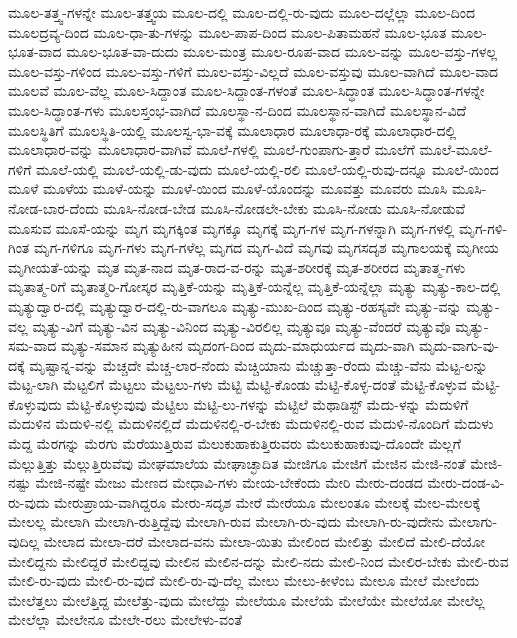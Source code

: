 {ಮೂಲ-ತತ್ತ್ವ-ಗಳನ್ನೇ
ಮೂಲ-ತತ್ತ್ವಯ
ಮೂಲ-ದಲ್ಲಿ
ಮೂಲ-ದಲ್ಲಿ-ರು-ವುದು
ಮೂಲ-ದಲ್ಲೆಲ್ಲಾ
ಮೂಲ-ದಿಂದ
ಮೂಲದ್ರವ್ಯ-ದಿಂದ
ಮೂಲ-ಧಾ-ತು-ಗಳನ್ನು
ಮೂಲ-ಪಾಪ-ದಿಂದ
ಮೂಲ-ಪಿತಾಮಹನೆ
ಮೂಲ-ಭೂತ
ಮೂಲ-ಭೂತ-ವಾದ
ಮೂಲ-ಭೂತ-ವಾ-ದುದು
ಮೂಲ-ಮಂತ್ರ
ಮೂಲ-ರೂಪ-ವಾದ
ಮೂಲ-ವನ್ನು
ಮೂಲ-ವಸ್ತು-ಗಳಲ್ಲ
ಮೂಲ-ವಸ್ತು-ಗಳಿಂದ
ಮೂಲ-ವಸ್ತು-ಗಳಿಗೆ
ಮೂಲ-ವಸ್ತು-ವಿಲ್ಲದೆ
ಮೂಲ-ವಸ್ತುವು
ಮೂಲ-ವಾಗಿದೆ
ಮೂಲ-ವಾದ
ಮೂಲವೆ
ಮೂಲ-ವೆಲ್ಲ
ಮೂಲ-ಸಿದ್ದಾಂತ
ಮೂಲ-ಸಿದ್ದಾಂತ-ಗಳಂತೆ
ಮೂಲ-ಸಿದ್ಧಾಂತ
ಮೂಲ-ಸಿದ್ಧಾಂತ-ಗಳನ್ನೇ
ಮೂಲ-ಸಿದ್ಧಾಂತ-ಗಳು
ಮೂಲಸ್ತಂಭ-ವಾಗಿದೆ
ಮೂಲಸ್ಥಾ-ನ-ದಿಂದ
ಮೂಲಸ್ಥಾನ-ವಾಗಿದೆ
ಮೂಲಸ್ಥಾನ-ವಿದೆ
ಮೂಲಸ್ಥಿತಿಗೆ
ಮೂಲಸ್ಥಿತಿ-ಯಲ್ಲಿ
ಮೂಲಸ್ವ-ಭಾ-ವಕ್ಕೆ
ಮೂಲಾಧಾರ
ಮೂಲಾಧಾ-ರಕ್ಕೆ
ಮೂಲಾಧಾರ-ದಲ್ಲಿ
ಮೂಲಾಧಾರ-ವನ್ನು
ಮೂಲಾಧಾರ-ವಾಗಿವೆ
ಮೂಲೆ-ಗಳಲ್ಲಿ
ಮೂಲೆ-ಗುಂಪಾಗು-ತ್ತಾರೆ
ಮೂಲೆಗೆ
ಮೂಲೆ-ಮೂಲೆ-ಗಳಿಗೆ
ಮೂಲೆ-ಯಲ್ಲಿ
ಮೂಲೆ-ಯಲ್ಲಿ-ಡು-ವುದು
ಮೂಲೆ-ಯಲ್ಲಿ-ರಲಿ
ಮೂಲೆ-ಯಲ್ಲಿ-ರುವು-ದನ್ನೂ
ಮೂಲೆ-ಯಿಂದ
ಮೂಳೆ
ಮೂಳೆಯ
ಮೂಳೆ-ಯನ್ನು
ಮೂಳೆ-ಯಿಂದ
ಮೂಳೆ-ಯೊಂದನ್ನು
ಮೂವತ್ತು
ಮೂವರು
ಮೂಸಿ
ಮೂಸಿ-ನೋಡ-ಬಾರ-ದೆಂದು
ಮೂಸಿ-ನೋಡ-ಬೇಡ
ಮೂಸಿ-ನೋಡಲೇ-ಬೇಕು
ಮೂಸಿ-ನೋಡು
ಮೂಸಿ-ನೋಡುವೆ
ಮೂಸುವ
ಮೂಸೆ-ಯನ್ನು
ಮೃಗ
ಮೃಗಕ್ಕಿಂತ
ಮೃಗಕ್ಕೂ
ಮೃಗಕ್ಕೆ
ಮೃಗ-ಗಳ
ಮೃಗ-ಗಳನ್ನಾಗಿ
ಮೃಗ-ಗಳಲ್ಲಿ
ಮೃಗ-ಗಳಿ-ಗಿಂತ
ಮೃಗ-ಗಳಿಗೂ
ಮೃಗ-ಗಳು
ಮೃಗ-ಗಳೆಲ್ಲ
ಮೃಗದ
ಮೃಗ-ವಿದೆ
ಮೃಗವು
ಮೃಗಸದೃಶ
ಮೃಗಾಲಯಕ್ಕೆ
ಮೃಗೀಯ
ಮೃಗೀಯತೆ-ಯನ್ನು
ಮೃತ
ಮೃತ-ನಾದ
ಮೃತ-ರಾದ-ವ-ರನ್ನು
ಮೃತ-ಶರೀರಕ್ಕೆ
ಮೃತ-ಶರೀರದ
ಮೃತಾತ್ಮ-ಗಳು
ಮೃತಾತ್ಮ-ರಿಗೆ
ಮೃತಾತ್ಮರಿ-ಗೋಸ್ಕರ
ಮೃತ್ತಿಕೆ-ಯನ್ನು
ಮೃತ್ತಿಕೆ-ಯನ್ನೆಲ್ಲ
ಮೃತ್ತಿಕೆ-ಯನ್ನೆಲ್ಲಾ
ಮೃತ್ಯು
ಮೃತ್ಯು-ಕಾಲ-ದಲ್ಲಿ
ಮೃತ್ಯುದ್ವಾರ-ದಲ್ಲಿ
ಮೃತ್ಯುದ್ವಾರ-ದಲ್ಲಿ-ರು-ವಾಗಲೂ
ಮೃತ್ಯು-ಮುಖ-ದಿಂದ
ಮೃತ್ಯು-ರಹಸ್ಯವೇ
ಮೃತ್ಯು-ವನ್ನು
ಮೃತ್ಯು-ವಲ್ಲ
ಮೃತ್ಯು-ವಿಗೆ
ಮೃತ್ಯು-ವಿನ
ಮೃತ್ಯು-ವಿನಿಂದ
ಮೃತ್ಯು-ವಿರಲಿಲ್ಲ
ಮೃತ್ಯುವೂ
ಮೃತ್ಯು-ವೆಂದರೆ
ಮೃತ್ಯುವೊ
ಮೃತ್ಯು-ಸಮ-ವಾದ
ಮೃತ್ಯು-ಸಮಾನ
ಮೃತ್ಯುಹೀನ
ಮೃದಂಗ-ದಿಂದ
ಮೃದು-ಮಾಧುರ್ಯದ
ಮೃದು-ವಾಗಿ
ಮೃದು-ವಾಗು-ವು-ದಕ್ಕೆ
ಮೃಷ್ಟಾನ್ನ-ವನ್ನು
ಮೆಚ್ಚದೇ
ಮೆಚ್ಚ-ಲಾರ-ನೆಂದು
ಮೆಚ್ಚಿಯಾನು
ಮೆಚ್ಚುತ್ತಾ-ರೆಂದು
ಮೆಚ್ಚು-ವೆನು
ಮೆಟ್ಟ-ಲನ್ನು
ಮೆಟ್ಟ-ಲಾಗಿ
ಮೆಟ್ಟಲಿಗೆ
ಮೆಟ್ಟಲು
ಮೆಟ್ಟಲು-ಗಳು
ಮೆಟ್ಟಿ
ಮೆಟ್ಟಿ-ಕೊಂಡು
ಮೆಟ್ಟಿ-ಕೊಳ್ಳ-ದಂತೆ
ಮೆಟ್ಟಿ-ಕೊಳ್ಳುವ
ಮೆಟ್ಟಿ-ಕೊಳ್ಳುವುದು
ಮೆಟ್ಟಿ-ಕೊಳ್ಳುವುವು
ಮೆಟ್ಟಿಲು
ಮೆಟ್ಟಿ-ಲು-ಗಳನ್ನು
ಮೆಟ್ಟಿಲೆ
ಮೆಥಾಡಿಸ್ಟ್
ಮೆದು-ಳನ್ನು
ಮೆದುಳಿಗೆ
ಮೆದುಳಿನ
ಮೆದುಳಿ-ನಲ್ಲಿ
ಮೆದುಳಿನಲ್ಲಿದೆ
ಮೆದುಳಿನಲ್ಲಿ-ರ-ಬೇಕು
ಮೆದುಳಿನಲ್ಲಿ-ರುವ
ಮೆದುಳಿ-ನೊಂದಿಗೆ
ಮೆದುಳು
ಮೆದ್ದ
ಮೆರಗನ್ನು
ಮೆರಗು
ಮೆರೆಯುತ್ತಿರುವ
ಮೆಲುಕುಹಾಕುತ್ತಿರುವರು
ಮೆಲುಕುಹಾಕುವು-ದೊಂದೇ
ಮೆಲ್ಲಗೆ
ಮೆಲ್ಲುತ್ತಿತ್ತು
ಮೆಲ್ಲುತ್ತಿರುವೆವು
ಮೇಘಮಾಲೆಯ
ಮೇಘಾಚ್ಛಾದಿತ
ಮೇಜಿಗೂ
ಮೇಜಿಗೆ
ಮೇಜಿನ
ಮೇಜಿ-ನಂತೆ
ಮೇಜಿ-ನಷ್ಟು
ಮೇಜಿ-ನಷ್ಟೇ
ಮೇಜು
ಮೇಣದ
ಮೇಧಾವಿ-ಗಳು
ಮೇಯ-ಬೇಕೆಂದು
ಮೇರಿ
ಮೇರು-ದಂಡದ
ಮೇರು-ದಂಡ-ವಿ-ರು-ವುದು
ಮೇರುಪ್ರಾಯ-ವಾಗಿದ್ದರೂ
ಮೇರು-ಸದೃಶ
ಮೇರೆ
ಮೇರೆಯೂ
ಮೇಲಂತೂ
ಮೇಲಕ್ಕೆ
ಮೇಲ-ಮೇಲಕ್ಕೆ
ಮೇಲಲ್ಲ
ಮೇಲಾಗಿ
ಮೇಲಾಗಿ-ರುತ್ತಿದ್ದೆವು
ಮೇಲಾಗಿ-ರುವ
ಮೇಲಾಗಿ-ರು-ವುದು
ಮೇಲಾಗಿ-ರು-ವುದೇನು
ಮೇಲಾಗು-ವುದಿಲ್ಲ
ಮೇಲಾದ
ಮೇಲಾ-ದರೆ
ಮೇಲಾದ-ವನು
ಮೇಲಾ-ಯಿತು
ಮೇಲಿಂದ
ಮೇಲಿತ್ತು
ಮೇಲಿದೆ
ಮೇಲಿ-ದೆಯೋ
ಮೇಲಿದ್ದನು
ಮೇಲಿದ್ದರೆ
ಮೇಲಿದ್ದವು
ಮೇಲಿನ
ಮೇಲಿನ-ದನ್ನು
ಮೇಲಿ-ನದು
ಮೇಲಿ-ನಿಂದ
ಮೇಲಿರ-ಬೇಕು
ಮೇಲಿ-ರುವ
ಮೇಲಿ-ರು-ವುದು
ಮೇಲಿ-ರು-ವುದೆ
ಮೇಲಿ-ರು-ವು-ದೆಲ್ಲ
ಮೇಲು
ಮೇಲು-ಕೀಳೆಂಬ
ಮೇಲೂ
ಮೇಲೆ
ಮೇಲೆಂದು
ಮೇಲೆತ್ತಲು
ಮೇಲೆತ್ತಿದ್ದ
ಮೇಲೆತ್ತು-ವುದು
ಮೇಲೆದ್ದು
ಮೇಲೆಯೂ
ಮೇಲೆಯೆ
ಮೇಲೆಯೇ
ಮೇಲೆಯೋ
ಮೇಲೆಲ್ಲ
ಮೇಲೆಲ್ಲಾ
ಮೇಲೇನೂ
ಮೇಲೇ-ರಲು
ಮೇಲೇಳು-ವಂತೆ
}
